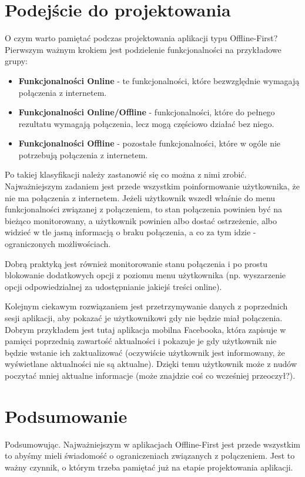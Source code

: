 \documentclass[a4paper, 12pt]{article}
\begin{document}
\section{Podejście do projektowania}
O czym warto pamiętać podczas projektowania aplikacji typu Offline-First? Pierwszym ważnym krokiem jest podzielenie funkcjonalności na przykładowe grupy:
\begin{itemize}
\item \textbf{Funkcjonalności Online} - te funkcjonalności, które bezwzględnie wymagają połączenia z internetem.
\item \textbf{Funkcjonalności Online/Offline} - funkcjonalności, które do pełnego rezultatu wymagają połączenia, lecz mogą częściowo działać bez niego.
\item \textbf{Funkcjonalności Offline} - pozostałe funkcjonalności, które w ogóle nie potrzebują połączenia z internetem.
\end{itemize}
Po takiej klasyfikacji należy zastanowić się co można z nimi zrobić. Najważniejszym zadaniem jest przede wszystkim poinformowanie użytkownika, że nie ma połączenia z internetem. Jeżeli użytkownik wszedł właśnie do menu funkcjonalności związanej z połączeniem, to stan połączenia powinien być na bieżąco monitorowany, a użytkownik powinien albo dostać ostrzeżenie, albo widzieć w tle jasną informacją o braku połączenia, a co za tym idzie - ograniczonych możliwościach.

Dobrą praktyką jest również monitorowanie stanu połączenia i po prostu blokowanie dodatkowych opcji z poziomu menu użytkownika (np. wyszarzenie opcji odpowiedzialnej za udostępnianie jakiejś treści online).

Kolejnym ciekawym rozwiązaniem jest przetrzymywanie danych z poprzednich sesji aplikacji, aby pokazać je użytkownikowi gdy nie będzie miał połączenia. Dobrym przykładem jest tutaj aplikacja mobilna Facebooka, która zapisuje w pamięci poprzednią zawartość aktualności i pokazuje je gdy użytkownik nie będzie wstanie ich zaktualizować (oczywiście użytkownik jest informowany, że wyświetlane aktualności nie są aktualne). Dzięki temu użytkownik może z nudów poczytać mniej aktualne informacje (może znajdzie coś co wcześniej przeoczył?).

\section{Podsumowanie}
Podsumowując. Najważniejszym w aplikacjach Offline-First jest przede wszystkim to abyśmy mieli świadomość o ograniczeniach związanych z połączeniem. Jest to ważny czynnik, o którym trzeba pamiętać już na etapie projektowania aplikacji.
\end{document}
